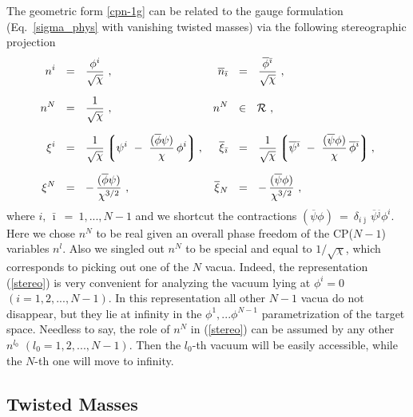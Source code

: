 \documentclass[12pt]{article}
\newcommand{\ov}{\overline}
\newcommand{\mc}[1]{\mathcal{#1}}
\newcommand{\lgr}{\left\lgroup}
\newcommand{\rgr}{\right\rgroup}
\newcommand{\bi}{{\bar \imath}}
\newcommand{\bj}{{\bar \jmath}}
\begin{document}
	The geometric form \eqref{cpn-1g} can be related to the gauge formulation (Eq.~\eqref{sigma_phys} with
	vanishing twisted masses) via the following stereographic projection
\begin{align}
%
\notag
	n^i & ~~=~~ \frac{\phi^i}{\sqrt{\chi}}~,
	& 
	\ov{n}_\bi & ~~=~~ \frac{\ov{\phi}{}^\bi}{\sqrt{\chi}}~,
\\[2mm]
%
\label{stereo}
	n^N & ~~=~~ \frac{1}{\sqrt{\chi}}~,
	& n^N & ~~\in~~ \mc{R}~,
\\[2mm]
%
\notag
	\xi^i & ~~=~~ \frac{1}{\sqrt{\chi}} \lgr \psi^i ~-~ \frac{(\ov{\phi}\psi)}{\chi}\,\phi^i \rgr,
	& 
	\ov{\xi}{}_\bi & ~~=~~ \frac{1}{\sqrt{\chi}} 
					\lgr \ov{\psi}{}^\bi ~-~ \frac{(\ov{\psi}\phi)}{\chi}\, \ov{\phi}{}^\bi \rgr,
\\[2mm]
%
\notag
	\xi^N & ~~=~~ -\, \frac{(\ov{\phi} \psi)}{\chi^{3/2}}~,
	&
	\ov{\xi}{}_N & ~~=~~ -\, \frac{(\ov{\psi} \phi)}{\chi^{3/2}}~,
\end{align}
	where $	i,\, \bi ~=~ 1, ..., N-1 $ and we shortcut the contractions 
	$ (\ov{\psi} \phi) ~=~ \delta_{i\bj}\, \ov{\psi}{}^\bj \phi^i $.
	Here we chose $ n^N $ to be real given an overall phase freedom of the CP($N-1$) variables $ n^l $.
	Also we singled out $ n^N $ to be special and equal to $ 1/\sqrt{\chi} $, 
	which corresponds to picking out one of the $ N $ vacua. Indeed,
	the representation (\ref{stereo}) is very convenient for
	analyzing the vacuum lying at $\phi^i=0$ $(i=1,2, ..., N-1)$. In this representation all other $N-1$ vacua do not disappear, 
	but they lie at infinity in the $\phi^1, ... \phi^{N-1}$ parametrization of the target space.
Needless to say, the role of $n^N$ in (\ref{stereo}) can be assumed by any other
$n^{l_0}$  $(l_0 = 1,2, ..., N-1)$.	Then the $l_0$-th vacuum will be easily accessible, while
the $N$-th one will move to infinity.


\subsection{Twisted Masses}
\label{twim}
\end{document}
